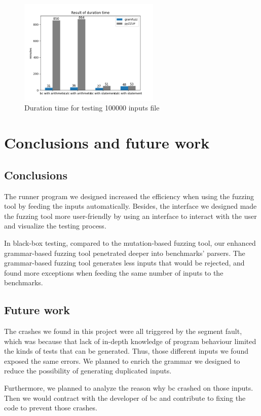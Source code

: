 \documentclass[11pt,a4paper]{article}
\begin{document}
\begin{figure}[H]
    \centering
    \label{duration}
    \includegraphics[width=0.6\textwidth]{duration.png}
    \caption{Duration time for testing 100000 inputs file}
\end{figure}


\section{Conclusions and future work}
\subsection{Conclusions}
The runner program we designed increased the efficiency when using the fuzzing tool by feeding the inputs automatically. Besides, the interface we designed made the fuzzing tool more user-friendly by using an interface to interact with the user and visualize the testing process.

In black-box testing, compared to the mutation-based fuzzing tool, our enhanced grammar-based fuzzing tool penetrated deeper into benchmarks' parsers. The grammar-based fuzzing tool generates less inputs that would be rejected, and found more exceptions when feeding the same number of inputs to the benchmarks. 
\subsection{Future work}
The crashes we found in this project were all triggered by the segment fault, which was because that lack of in-depth knowledge of program behaviour limited the kinds of tests that can be generated. Thus, those different inputs we found exposed the same errors. We planned to enrich the grammar we designed to reduce the possibility of generating duplicated inputs. 

Furthermore, we planned to analyze the reason why {\cc bc} crashed on those inputs. Then we would contract with the developer of {\cc bc} and contribute to fixing the code to prevent those crashes.

 
\end{document}
